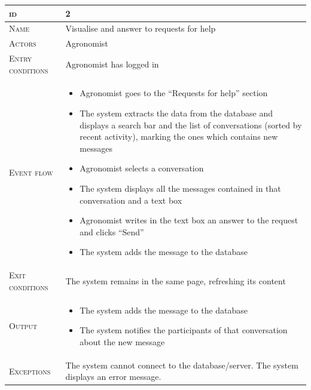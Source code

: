 \begin{table}[H]
    \centering
    \begin{tabular}[c]{|l|p{}|}
        \hline %
    	\textsc{id}                 &   2\\
    	\hline %
    	\textsc{Name}               &   Visualise and answer to requests for help\\
    	\hline %
    	\textsc{Actors}             &   Agronomist\\
    	\hline %
    	\textsc{Entry conditions}   &   Agronomist has logged in\\
    	\hline %
    	\textsc{Event flow}         &   \footnotesize
            	                        \begin{itemize}
                                    	    \item Agronomist goes to the “Requests for help” section
                                    		\item The system extracts the data from the database and displays a search bar and the list of conversations (sorted by recent activity), marking the ones which contains new messages
                                    		\item Agronomist selects a conversation
                                    		\item The system displays all the messages contained in that conversation and a text box
                                    		\item Agronomist writes in the text box an answer to the request and clicks “Send”
                                    		\item The system adds the message to the database
                                        \end{itemize}\\
        \hline %
        \textsc{Exit conditions}    &  The system remains in the same page, refreshing its content\\
    	\hline %
    	\textsc{Output}             &  \begin{itemize}
    	    \item The system adds the message to the database
    	    \item The system notifies the participants of that conversation about the new message
    	\end{itemize}\\
    	\hline %
    	\textsc{Exceptions}         &  The system cannot connect to the database/server. The system displays an error message.\\
    	\hline %
        

\end{tabular}
\end{table}
